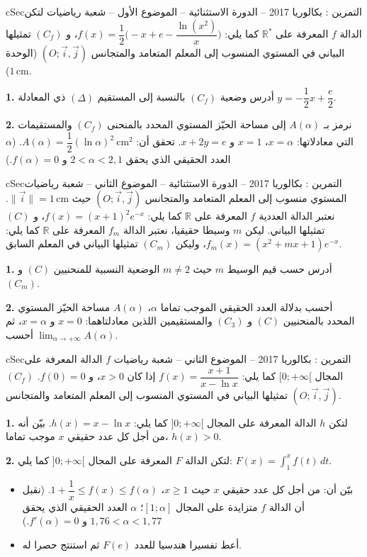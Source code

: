 \documentclass[12pt,a4paper]{article}
\newenvironment{BOX}[2]{\begin{otherlanguage}{english}\begin{arbox}{#1}{#2}}{\end{arbox}\end{otherlanguage}}
\newcounter{exo}
\newenvironment{tamrin}[1]{\stepcounter{exo}\begin{BOX}{cSec}{التمرين \theexo: #1}}{\end{BOX}}
\newcommand{\R}{\mathbb{R}}
\newenvironment{sq}{\begin{itemize}[leftmargin=2.4em,itemsep=3pt]}{\end{itemize}}
\newcommand{\qa}{\item[(أ)]}\newcommand{\qb}{\item[(ب)]}\newcommand{\qc}{\item[(جـ)]}\newcommand{\qd}{\item[(د)]}\newcommand{\qe}{\item[(هـ)]}
\newcommand{\QQ}[1]{\par\smallskip\textbf{#1.} }
\begin{document}
\begin{tamrin}{بكالوريا 2017 -- الدورة الاستثنائية -- الموضوع الأول -- شعبة رياضيات}
لتكن الدالة $f$ المعرفة على $\R^*$ كما يلي: $f(x)=\dfrac12\Big(-x+e-\dfrac{\ln(x^2)}{x}\Big)$، و $(C_f)$ تمثيلها البياني في المستوي المنسوب إلى المعلم المتعامد والمتجانس $(O;\vec i,\vec j)$ (الوحدة $1\,\text{cm}$).
\QQ{1} أدرس وضعية $(C_f)$ بالنسبة إلى المستقيم $(\Delta)$ ذي المعادلة $y=-\dfrac12x+\dfrac e2$.
\QQ{2} نرمز بـ $A(\alpha)$ إلى مساحة الحيّز المستوي المحدد بالمنحنى $(C_f)$ والمستقيمات التي معادلاتها: $x=\alpha$، $x=1$ و $x+2y=e$.
تحقق أن: $A(\alpha)=\dfrac12(\ln\alpha)^2\ \text{cm}^2$. ($\alpha$ العدد الحقيقي الذي يحقق $2<\alpha<2{,}1$ و $f(\alpha)=0$.)
\end{tamrin}

\begin{tamrin}{بكالوريا 2017 -- الدورة الاستثنائية -- الموضوع الثاني -- شعبة رياضيات}
المستوي منسوب إلى المعلم المتعامد والمتجانس $(O;\vec i,\vec j)$ حيث $\|\vec i\|=1\,\text{cm}$.
نعتبر الدالة العددية $f$ المعرفة على $\R$ كما يلي: $f(x)=(x+1)^2e^{-x}$، و $(C)$ تمثيلها البياني.
ليكن $m$ وسيطا حقيقيا، نعتبر الدالة $f_m$ المعرفة على $\R$ كما يلي: $f_m(x)=(x^2+mx+1)e^{-x}$، وليكن $(C_m)$ تمثيلها البياني في المعلم السابق.
\QQ{1} أدرس حسب قيم الوسيط $m$ حيث $m\neq2$ الوضعية النسبية للمنحنيين $(C)$ و $(C_m)$.
\QQ{2} أحسب بدلالة العدد الحقيقي الموجب تماما $\alpha$، $A(\alpha)$ مساحة الحيّز المستوي المحدد بالمنحنيين $(C)$ و $(C_3)$ والمستقيمين اللذين معادلتاهما: $x=0$ و $x=\alpha$، ثم أحسب $\displaystyle\lim_{\alpha\to+\infty}A(\alpha)$.
\end{tamrin}

\begin{tamrin}{بكالوريا 2017 -- الموضوع الثاني -- شعبة رياضيات}
$f$ الدالة المعرفة على المجال $[0;+\infty[$ كما يلي: $f(x)=\dfrac{x+1}{x-\ln x}$ إذا كان $x>0$، و $f(0)=0$.
$(C_f)$ تمثيلها البياني في المستوي المنسوب إلى المعلم المتعامد والمتجانس $(O;\vec i,\vec j)$.
\QQ{1} لتكن $h$ الدالة المعرفة على المجال $]0;+\infty[$ كما يلي: $h(x)=x-\ln x$. بيّن أنه من أجل كل عدد حقيقي $x$ موجب تماما، $h(x)>0$.
\QQ{2} لتكن الدالة $F$ المعرفة على المجال $]0;+\infty[$ كما يلي: $F(x)=\displaystyle\int_1^xf(t)\,dt$.
\begin{sq}
\qa بيّن أن: من أجل كل عدد حقيقي $x$ حيث $x\ge1$، $1+\dfrac1x\le f(x)\le f(\alpha)$. (نقبل أن الدالة $f$ متزايدة على المجال $[1;\alpha]$؛ $\alpha$ العدد الحقيقي الذي يحقق $1{,}76<\alpha<1{,}77$ و $f'(\alpha)=0$.)
\qb أعط تفسيرا هندسيا للعدد $F(e)$ ثم استنتج حصرا له.
\end{sq}
\end{tamrin}
\end{document}
